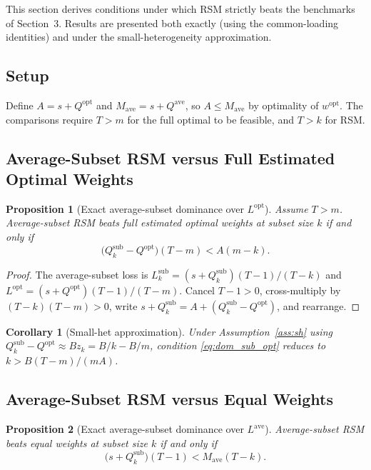 \documentclass[12pt,a4paper]{article}
\newtheorem{proposition}{Proposition}
\newtheorem{corollary}{Corollary}[proposition]
\theoremstyle{definition}
\begin{document}
This section derives conditions under which RSM strictly beats the benchmarks
of Section~3. Results are presented both exactly (using the common-loading
identities) and under the small-heterogeneity approximation.

\subsection{Setup}

Define $A=s+Q^{\mathrm{opt}}$ and $M_{\mathrm{ave}}=s+Q^{\mathrm{ave}}$,
so $A\leq M_{\mathrm{ave}}$ by optimality of $w^{\mathrm{opt}}$.
The comparisons require $T>m$ for the full optimal to be feasible, and
$T>k$ for RSM.

\subsection{Average-Subset RSM versus Full Estimated Optimal Weights}

\begin{proposition}[Exact average-subset dominance over $L^{\mathrm{opt}}$]
\label{prop:dom_sub_opt}
Assume $T>m$. Average-subset RSM beats full estimated optimal weights at
subset size $k$ if and only if
\begin{equation}\label{eq:dom_sub_opt}
\bigl(Q_k^{\mathrm{sub}} - Q^{\mathrm{opt}}\bigr)(T-m) < A(m-k).
\end{equation}
\end{proposition}

\begin{proof}
The average-subset loss is $L_k^{\mathrm{sub}}=(s+Q_k^{\mathrm{sub}})(T-1)/(T-k)$
and $L^{\mathrm{opt}}=(s+Q^{\mathrm{opt}})(T-1)/(T-m)$. Cancel $T-1>0$,
cross-multiply by $(T-k)(T-m)>0$, write $s+Q_k^{\mathrm{sub}}=A+(Q_k^{\mathrm{sub}}-Q^{\mathrm{opt}})$,
and rearrange.
\end{proof}

\begin{corollary}[Small-het approximation]
Under Assumption~\ref{ass:sh} using $Q_k^{\mathrm{sub}}-Q^{\mathrm{opt}}\approx Bz_k=B/k-B/m$,
condition \eqref{eq:dom_sub_opt} reduces to $k>B(T-m)/(mA)$.
\end{corollary}

\subsection{Average-Subset RSM versus Equal Weights}

\begin{proposition}[Exact average-subset dominance over $L^{\mathrm{ave}}$]
Average-subset RSM beats equal weights at subset size $k$ if and only if
\begin{equation}\label{eq:dom_sub_ave}
\bigl(s+Q_k^{\mathrm{sub}}\bigr)(T-1) < M_{\mathrm{ave}}(T-k).
\end{equation}
\end{proposition}
\end{document}
